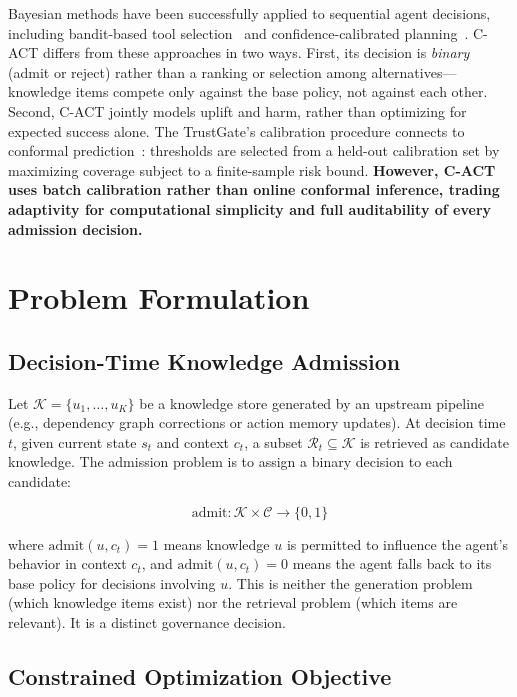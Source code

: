 \documentclass[letterpaper]{article}
\begin{document}
Bayesian methods have been successfully applied to sequential agent decisions, including bandit-based tool selection~\cite{ael2026} and confidence-calibrated planning~\cite{ccp2026}. \textsc{C-ACT} differs from these approaches in two ways. First, its decision is \emph{binary} (admit or reject) rather than a ranking or selection among alternatives---knowledge items compete only against the base policy, not against each other. Second, \textsc{C-ACT} jointly models uplift and harm, rather than optimizing for expected success alone. The TrustGate's calibration procedure connects to conformal prediction~\cite{angelopoulos2021}: thresholds are selected from a held-out calibration set by maximizing coverage subject to a finite-sample risk bound. \textbf{However, \textsc{C-ACT} uses batch calibration rather than online conformal inference, trading adaptivity for computational simplicity and full auditability of every admission decision.}

\section{Problem Formulation}

\subsection{Decision-Time Knowledge Admission}

Let $\mathcal{K} = \{u_1, \ldots, u_K\}$ be a knowledge store generated by an upstream pipeline (e.g., dependency graph corrections or action memory updates). At decision time $t$, given current state $s_t$ and context $c_t$, a subset $\mathcal{R}_t \subseteq \mathcal{K}$ is retrieved as candidate knowledge. The admission problem is to assign a binary decision to each candidate:

\begin{equation}
\label{eq:admission}
\text{admit}: \mathcal{K} \times \mathcal{C} \rightarrow \{0, 1\}
\end{equation}

where $\text{admit}(u, c_t) = 1$ means knowledge $u$ is permitted to influence the agent's behavior in context $c_t$, and $\text{admit}(u, c_t) = 0$ means the agent falls back to its base policy for decisions involving $u$. This is neither the generation problem (which knowledge items exist) nor the retrieval problem (which items are relevant). It is a distinct governance decision.

\subsection{Constrained Optimization Objective}
\end{document}
